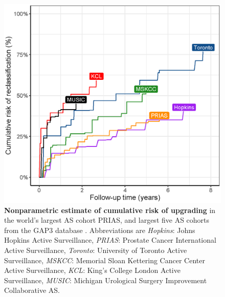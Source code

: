 \begin{figure}
\centerline{\includegraphics[width=\columnwidth]{images/npmle_plot.eps}}
\caption{\textbf{Nonparametric estimate \citep{turnbull1976empirical} of cumulative risk of upgrading} in the world's largest AS cohort PRIAS, and largest five AS cohorts from the GAP3 database \citep{gap3_2018}. Abbreviations are \textit{Hopkins}: Johns Hopkins Active Surveillance, \textit{PRIAS}: Prostate Cancer International Active Surveillance, \textit{Toronto}: University of Toronto Active Surveillance, \textit{MSKCC}: Memorial Sloan Kettering Cancer Center Active Surveillance, \textit{KCL}: King's College London Active Surveillance, \textit{MUSIC}: Michigan Urological Surgery Improvement Collaborative AS.}
\label{fig:npmle_plot}
\end{figure}

